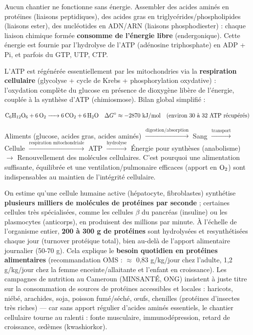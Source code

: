 \documentclass[11pt]{article}
\newcommand{\cle}[1]{{\popxbold\color{popdark}#1}}
\newcounter{popsec}
\newcounter{popsub}
\newcommand{\courssub}[1]{%
  \stepcounter{popsub}%
  \par\vspace{9pt}\noindent{\popxbold\fontsize{11.5}{13}\selectfont\color{popink}{\color{poporange}\thepopsec.\thepopsub}\hspace{6pt}#1}\par\nopagebreak\vspace{4pt}
}
\begin{document}
\courssub{Le coût énergétique des synthèses : la facture ATP}

Aucun chantier ne fonctionne sans énergie. Assembler des acides aminés en protéines (liaisons peptidiques), des acides gras en triglycérides/phospholipides (liaisons ester), des nucléotides en ADN/ARN (liaisons phosphodiester) : chaque liaison chimique formée \textbf{consomme de l'énergie libre} (endergonique). Cette énergie est fournie par l'hydrolyse de l'\cle{ATP} (adénosine triphosphate) en ADP + Pi, et parfois du GTP, UTP, CTP.

L'ATP est régénérée essentiellement par les \cle{mitochondries} via la \textbf{respiration cellulaire} (glycolyse + cycle de Krebs + phosphorylation oxydative) : l'oxydation complète du glucose en présence de dioxygène libère de l'énergie, couplée à la synthèse d'ATP (chimiosmose). Bilan global simplifié :

\[ \ce{C6H12O6 + 6O2 -> 6CO2 + 6H2O} \quad \Delta G^\circ \approx -2870 \text{ kJ/mol} \quad \text{(environ 30 à 32 ATP récupérés)} \]

\begin{aretenir}
Aliments (glucose, acides gras, acides aminés) $\xrightarrow{\text{digestion/absorption}}$ Sang $\xrightarrow{\text{transport}}$ Cellule $\xrightarrow{\text{respiration mitochondriale}}$ ATP $\xrightarrow{\text{hydrolyse}}$ Énergie pour synthèses (anabolisme) $\to$ Renouvellement des molécules cellulaires. C'est pourquoi une alimentation suffisante, équilibrée et une ventilation/pulmonaire efficaces (apport en $\ce{O2}$) sont indispensables au maintien de l'intégrité cellulaire.
\end{aretenir}

\begin{savaistu}
On estime qu'une cellule humaine active (hépatocyte, fibroblastes) synthétise \textbf{plusieurs milliers de molécules de protéines par seconde} ; certaines cellules très spécialisées, comme les cellules $\beta$ du pancréas (insuline) ou les plasmocytes (anticorps), en produisent des millions par minute. À l'échelle de l'organisme entier, \textbf{200 à 300 g de protéines} sont hydrolysées et resynthétisées chaque jour (turnover protéique total), bien au-delà de l'apport alimentaire journalier (50-70 g). Cela explique le \textbf{besoin quotidien en protéines alimentaires} (recommandation OMS : $\approx$ 0,83 g/kg/jour chez l'adulte, 1,2 g/kg/jour chez la femme enceinte/allaitante et l'enfant en croissance). Les campagnes de nutrition au Cameroun (MINSANTÉ, ONG) insistent à juste titre sur la consommation de sources de protéines accessibles et locales : haricots, niébé, arachides, soja, poisson fumé/séché, œufs, chenilles (protéines d'insectes très riches) — car sans apport régulier d'acides aminés essentiels, le chantier cellulaire tourne au ralenti : fonte musculaire, immunodépression, retard de croissance, œdèmes (kwashiorkor).
\end{savaistu}
\end{document}
